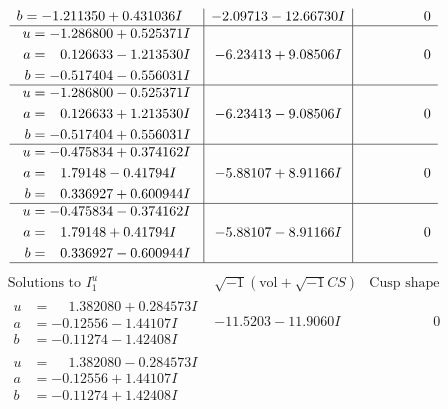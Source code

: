 \documentclass[1p]{elsarticle_modified}
\theoremstyle{definition}
\newcommand{\I}{\sqrt{-1}}
\begin{document}
$$\begin{array}{c|c|c}
\begin{aligned}
b &= -1.211350 + 0.431036 I\end{aligned}
 & -2.09713 - 12.66730 I & \phantom{-0.000000 } 0 \\ \hline\begin{aligned}
u &= -1.286800 + 0.525371 I \\
a &= \phantom{-}0.126633 - 1.213530 I \\
b &= -0.517404 - 0.556031 I\end{aligned}
 & -6.23413 + 9.08506 I & \phantom{-0.000000 } 0 \\ \hline\begin{aligned}
u &= -1.286800 - 0.525371 I \\
a &= \phantom{-}0.126633 + 1.213530 I \\
b &= -0.517404 + 0.556031 I\end{aligned}
 & -6.23413 - 9.08506 I & \phantom{-0.000000 } 0 \\ \hline\begin{aligned}
u &= -0.475834 + 0.374162 I \\
a &= \phantom{-}1.79148 - 0.41794 I \\
b &= \phantom{-}0.336927 + 0.600944 I\end{aligned}
 & -5.88107 + 8.91166 I & \phantom{-0.000000 } 0 \\ \hline\begin{aligned}
u &= -0.475834 - 0.374162 I \\
a &= \phantom{-}1.79148 + 0.41794 I \\
b &= \phantom{-}0.336927 - 0.600944 I\end{aligned}
 & -5.88107 - 8.91166 I & \phantom{-0.000000 } 0\\
 \hline 
 \end{array}$$\newpage$$\begin{array}{c|c|c}  
\text{Solutions to }I^u_{1}& \I (\text{vol} + \sqrt{-1}CS) & \text{Cusp shape}\\
 \hline 
\begin{aligned}
u &= \phantom{-}1.382080 + 0.284573 I \\
a &= -0.12556 - 1.44107 I \\
b &= -0.11274 - 1.42408 I\end{aligned}
 & -11.5203 - 11.9060 I & \phantom{-0.000000 } 0 \\ \hline\begin{aligned}
u &= \phantom{-}1.382080 - 0.284573 I \\
a &= -0.12556 + 1.44107 I \\
b &= -0.11274 + 1.42408 I\end{aligned}

\end{array}$$
\end{document}
